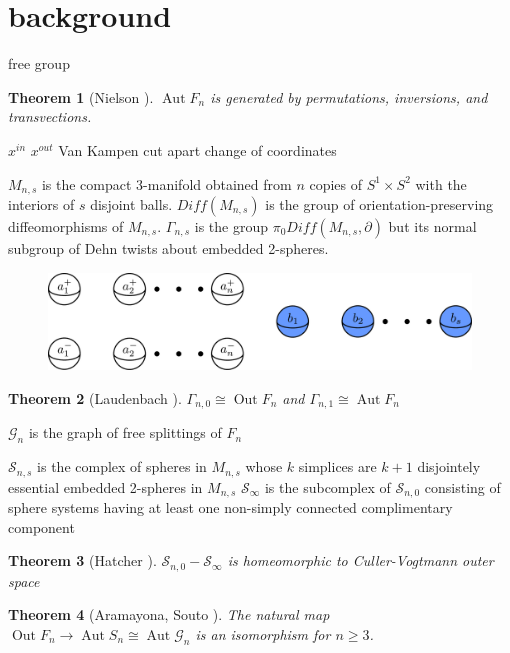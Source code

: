 \documentclass[11pt]{article}
\newcommand{\G}{\mathcal{G}}
\DeclareMathOperator{\oout}{Out}
\DeclareMathOperator{\aaut}{Aut}
\newtheorem{theorem}{Theorem}
\theoremstyle{remark}
\theoremstyle{definition}
\begin{document}
\section{background}

free group


\begin{theorem}[Nielson \cite{Nielsen1924}]
$\aaut F_n$ is generated by
permutations,
inversions,
and
transvections.
\end{theorem}


$x^{in}$
$x^{out}$
Van Kampen
cut apart
change of coordinates

$M_{n,s}$ is the compact 3-manifold obtained
from $n$ copies of $S^1 \times S^2$ with
the interiors of $s$ disjoint balls.
$Diff(M_{n,s})$ is the group of orientation-preserving diffeomorphisms of $M_{n,s}$.
$\Gamma_{n,s}$
is the group
$\pi_0 Diff(M_{n,s}, \partial)$
but its normal subgroup of Dehn twists about embedded 2-spheres.


\begin{figure}[h!]
  \centering
  \includegraphics[width=\textwidth]{figures/spherestoglue.pdf}
  \caption{}
  \label{fig:sphereglue}
\end{figure}

\begin{theorem}[Laudenbach \cite{MR0314054}]
$\Gamma_{n,0} \cong \oout F_n$ and $\Gamma_{n,1} \cong \aaut F_n$
\end{theorem}

$\G_n$ is the graph of free splittings of $F_n$


$\mathcal S_{n,s}$ is the complex of spheres in $M_{n,s}$
whose $k$ simplices are $k+1$ disjointely essential embedded 2-spheres in $M_{n,s}$
$\mathcal S_\infty$ is the subcomplex of $\mathcal S_{n,0}$
consisting of sphere systems having at least one non-simply connected complimentary component


\begin{theorem}[Hatcher \cite{MR1314940}]
$\mathcal S_{n,0} - \mathcal S_\infty$ is homeomorphic to Culler-Vogtmann outer space
\end{theorem}

\begin{theorem}[Aramayona, Souto \cite{souto}]
\label{aramsouto}
The natural map $\oout F_n \to \aaut S_n  \cong \aaut \G_n$ is an isomorphism for $n\geq 3$.
\end{theorem}
\end{document}
